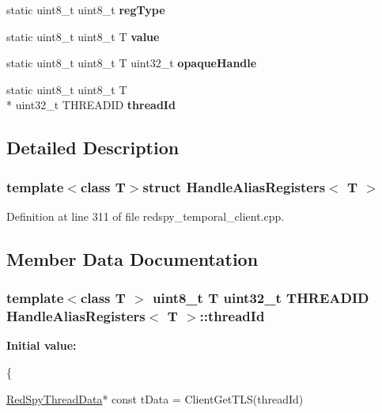 \begin{DoxyCompactItemize}
\item 
\hypertarget{structHandleAliasRegisters_a86b6b2c02f3473c44b419c2d3a5bdf5a}{static uint8\-\_\-t uint8\-\_\-t {\bfseries reg\-Type}}\label{structHandleAliasRegisters_a86b6b2c02f3473c44b419c2d3a5bdf5a}

\item 
\hypertarget{structHandleAliasRegisters_a5815216179c98a9a8b91101b8af4fae0}{static uint8\-\_\-t uint8\-\_\-t T {\bfseries value}}\label{structHandleAliasRegisters_a5815216179c98a9a8b91101b8af4fae0}

\item 
\hypertarget{structHandleAliasRegisters_ad89296aa851088278d0648bcc83792aa}{static uint8\-\_\-t uint8\-\_\-t T uint32\-\_\-t {\bfseries opaque\-Handle}}\label{structHandleAliasRegisters_ad89296aa851088278d0648bcc83792aa}

\item 
static uint8\-\_\-t uint8\-\_\-t T \\*
uint32\-\_\-t T\-H\-R\-E\-A\-D\-I\-D {\bfseries thread\-Id}
\end{DoxyCompactItemize}


\subsection{Detailed Description}
\subsubsection*{template$<$class T$>$struct Handle\-Alias\-Registers$<$ T $>$}



Definition at line 311 of file redspy\-\_\-temporal\-\_\-client.\-cpp.



\subsection{Member Data Documentation}
\hypertarget{structHandleAliasRegisters_a3f5cd6f8a8ee21d2f352bc90c20a99a9}{
\subsubsection[{thread\-Id}]{\setlength{\rightskip}{0pt plus 5cm}template$<$class T $>$ uint8\-\_\-t T uint32\-\_\-t T\-H\-R\-E\-A\-D\-I\-D {\bf Handle\-Alias\-Registers}$<$ T $>$\-::thread\-Id}}\label{structHandleAliasRegisters_a3f5cd6f8a8ee21d2f352bc90c20a99a9}
{\bfseries Initial value\-:}
\begin{DoxyCode}
\{
        
        \hyperlink{structRedSpyThreadData}{RedSpyThreadData}* \textcolor{keyword}{const} tData = ClientGetTLS(threadId)
\end{DoxyCode}


